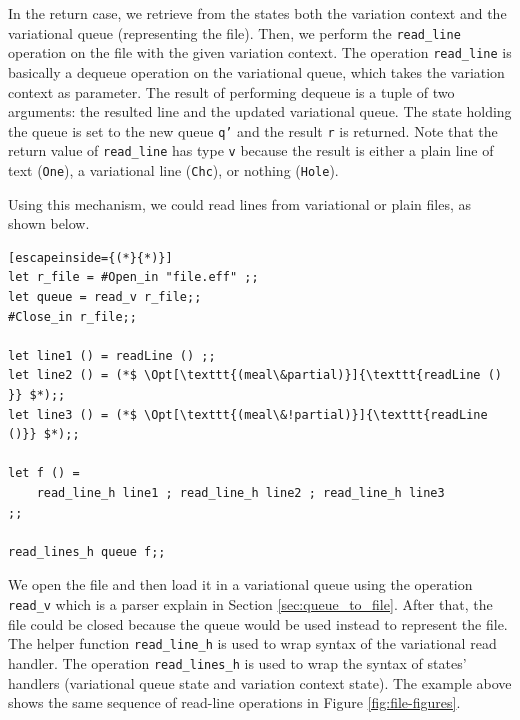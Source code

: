 In the return case, we retrieve from the states both the variation context and the variational queue (representing the file). Then, we perform the \texttt{read\_line} operation on the file with the given variation context. The operation \texttt{read\_line} is basically a dequeue operation on the variational queue, which takes the variation context as parameter. The result of performing dequeue is a tuple of two arguments: the resulted line and the updated variational queue. The state holding the queue is set to the new queue \texttt{q'} and the result \texttt{r} is returned. Note that the return value of \texttt{read\_line} has type \texttt{v} because the result is either a plain line of text (\texttt{One}), a variational line (\texttt{Chc}), or nothing (\texttt{Hole}). 

Using this mechanism, we could read lines from variational or plain files, as shown below. 
%
\begin{lstlisting}[escapeinside={(*}{*)}]
let r_file = #Open_in "file.eff" ;;
let queue = read_v r_file;;
#Close_in r_file;;

let line1 () = readLine () ;;
let line2 () = (*$ \Opt[\texttt{(meal\&partial)}]{\texttt{readLine () }} $*);;
let line3 () = (*$ \Opt[\texttt{(meal\&!partial)}]{\texttt{readLine ()}} $*);;

let f () =
	read_line_h line1 ; read_line_h line2 ; read_line_h line3
;;

read_lines_h queue f;;
\end{lstlisting}
%
We open the file and then load it in a variational queue using the operation \texttt{read\_v} which is a parser explain in Section \ref{sec:queue_to_file}. After that, the file could be closed because the queue would be used instead to represent the file. The helper function \texttt{read\_line\_h} is used to wrap syntax of the variational read handler. The operation \texttt{read\_lines\_h} is used to wrap the syntax of states' handlers (variational queue state and variation context state). The example above shows the same sequence of read-line operations in Figure \ref{fig:file-figures}.

